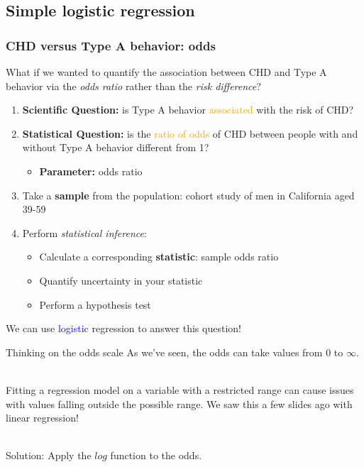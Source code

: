 \documentclass[10pt,t]{beamer}
\begin{document}
\subsection{Simple logistic regression}
\begin{frame}
	\frametitle{CHD versus Type A behavior: odds}
	\vspace{-0.5cm}
	\begin{small} What if we wanted to quantify the association between CHD and Type A behavior via the \textit{odds ratio} rather than the \textit{risk difference}? \end{small} \pause

	\begin{enumerate}
			\item \textbf{Scientific Question:} is Type A behavior \textcolor{orange}{associated} with the risk of CHD? \pause
			\item \textbf{Statistical Question:} is the \textcolor{orange}{ratio of odds} of CHD between people with and without Type A behavior different from 1? \pause
			\begin{itemize}
					\item \textbf{Parameter:} odds ratio \pause
				\end{itemize}
			\item Take a \textbf{sample} from the population: cohort study of men in California aged 39-59 \pause
			\item Perform \textit{statistical inference}:
			\begin{itemize}
					\item Calculate a corresponding \textbf{statistic}: sample odds ratio
					\item Quantify uncertainty in your statistic
					\item Perform a hypothesis test \pause
				\end{itemize}
		\end{enumerate}
	
	\vspace{-0.2cm}
	We can use \textcolor{blue}{logistic} regression to answer this question!
\end{frame}

\begin{frame}{Thinking on the odds scale}
	As we've seen, the odds can take values from 0 to $\infty$. 
	\\ ~\
	
	Fitting a regression model on a variable with a restricted range can cause issues with values falling outside the possible range. We saw this a few slides ago with linear regression!
	\\ ~\
	
	Solution: Apply the $log$ function to the odds. 
\end{frame}
\end{document}
